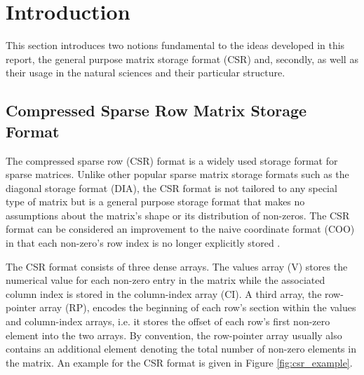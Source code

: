 \chapter{Introduction}

  This section introduces two notions fundamental to the ideas developed in this report, the general purpose
   matrix storage format (CSR) and, secondly,  as well as
  their usage in the natural sciences and their particular structure.

  \section{Compressed Sparse Row Matrix Storage Format}

    The compressed sparse row (CSR) format is a widely used storage format for sparse matrices. Unlike other popular
    sparse matrix storage formats such as the diagonal storage format (DIA), the CSR format is not tailored to any
    special type of matrix but is a general purpose storage format that makes no assumptions about the matrix's shape or
    its distribution of non-zeros. The CSR format can be considered an improvement to the naive coordinate format (COO)
    in that each non-zero's row index is no longer explicitly stored \cite{Bell2011}.

    The CSR format consists of three dense arrays. The values array (V) stores the numerical value for each non-zero
    entry in the matrix while the associated column index is stored in the column-index array (CI). A third array, the
    row-pointer array (RP), encodes the beginning of each row's section within the values and column-index arrays, i.e.
    it stores the offset of each row's first non-zero element into the two arrays. By convention, the row-pointer array
    usually also contains an additional element denoting the total number of non-zero elements in the matrix. An example
    for the CSR format is given in Figure \ref{fig:csr_example}.

